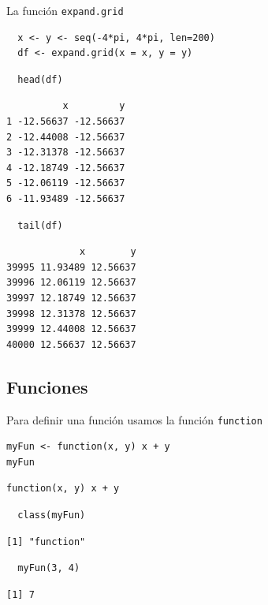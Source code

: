 \documentclass[xcolor={usenames,svgnames,dvipsnames}]{beamer}
\begin{document}
\begin{frame}[fragile,label=sec-2-4-3]{La función \texttt{expand.grid}}
 \lstset{language=R,label= ,caption= ,numbers=none}
\begin{lstlisting}
  x <- y <- seq(-4*pi, 4*pi, len=200)
  df <- expand.grid(x = x, y = y)
\end{lstlisting}

\lstset{language=R,label= ,caption= ,numbers=none}
\begin{lstlisting}
  head(df)
\end{lstlisting}

\begin{verbatim}
          x         y
1 -12.56637 -12.56637
2 -12.44008 -12.56637
3 -12.31378 -12.56637
4 -12.18749 -12.56637
5 -12.06119 -12.56637
6 -11.93489 -12.56637
\end{verbatim}

\lstset{language=R,label= ,caption= ,numbers=none}
\begin{lstlisting}
  tail(df)
\end{lstlisting}

\begin{verbatim}
             x        y
39995 11.93489 12.56637
39996 12.06119 12.56637
39997 12.18749 12.56637
39998 12.31378 12.56637
39999 12.44008 12.56637
40000 12.56637 12.56637
\end{verbatim}
\end{frame}

\subsection{Funciones}
\label{sec-2-5}

\begin{frame}[fragile,label=sec-2-5-1]{Para definir una función usamos la función \texttt{function}}
 \lstset{language=R,label= ,caption= ,numbers=none}
\begin{lstlisting}
myFun <- function(x, y) x + y
myFun
\end{lstlisting}

\begin{verbatim}
function(x, y) x + y
\end{verbatim}

\lstset{language=R,label= ,caption= ,numbers=none}
\begin{lstlisting}
  class(myFun)
\end{lstlisting}

\begin{verbatim}
[1] "function"
\end{verbatim}


\lstset{language=R,label= ,caption= ,numbers=none}
\begin{lstlisting}
  myFun(3, 4)
\end{lstlisting}

\begin{verbatim}
[1] 7
\end{verbatim}
\end{frame}
\end{document}

